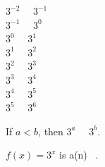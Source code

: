 \documentclass{ximera}
\author{Lee Wayand}
\begin{document}
\begin{example}


\begin{question}


$3^{-2}$ \, \wordChoice{\choice[correct]{$<$} \choice{$>$}} \, $3^{-1}$  \\

$3^{-1}$ \, \wordChoice{\choice[correct]{$<$} \choice{$>$}} \, $3^{0}$  \\

$3^{0}$ \, \wordChoice{\choice[correct]{$<$} \choice{$>$}} \, $3^{1}$  \\

$3^{1}$ \, \wordChoice{\choice[correct]{$<$} \choice{$>$}} \, $3^{2}$  \\

$3^{2}$ \, \wordChoice{\choice[correct]{$<$} \choice{$>$}} \, $3^{3}$  \\

$3^{3}$ \, \wordChoice{\choice[correct]{$<$} \choice{$>$}} \, $3^{4}$  \\

$3^{4}$ \, \wordChoice{\choice[correct]{$<$} \choice{$>$}} \, $3^{5}$  \\

$3^{5}$ \, \wordChoice{\choice[correct]{$<$} \choice{$>$}} \, $3^{6}$  \\


\end{question}




\begin{question}



If $a < b$, then $3^{a}$ \, \wordChoice{\choice[correct]{$<$} \choice{$>$}} \, $3^{b}$.  \\



\end{question}





\begin{question}



$f(x) = 3^{x}$  is a(n) \,  .  \\



\end{question}





















\end{example}
\end{document}
